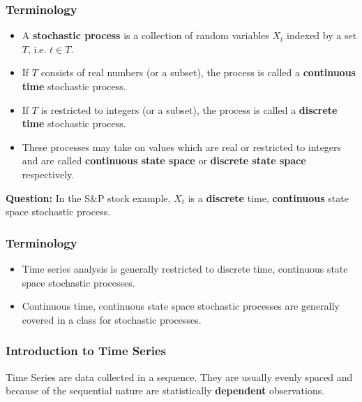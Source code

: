 \documentclass[%
xcolor=pdftex]{beamer}
\begin{document}
\begin{frame}
\frametitle{Terminology}

\begin{itemize}

\item A \textbf{stochastic process} is a collection of random variables $X_t$ indexed by a set $T$, i.e. $t \in T$.


\item If $T$ consists of real numbers (or a subset), the process is called a \textbf{continuous time} stochastic process.

\item If $T$ is restricted to integers (or a subset), the process is called a \textbf{discrete time} stochastic process.

\item These processes may take on values which are real or restricted to integers and are called \textbf{continuous state space} or \textbf{discrete state space} respectively. 

\end{itemize}

\textbf{Question:} In the S\&P stock example, $X_t$ is a \textbf{discrete} time, \textbf{continuous} state space stochastic process.

\end{frame}

\begin{frame}
\frametitle{Terminology}

\begin{itemize}

\item Time series analysis is generally restricted to discrete time, continuous state space stochastic processes.

\item Continuous time, continuous state space stochastic processes are generally covered in a class for stochastic processes.

\end{itemize}

\end{frame}

\begin{frame}
\frametitle{Introduction to Time Series}

Time Series are data collected in a sequence.  They are usually evenly spaced and because of the sequential nature are statistically \textbf{dependent} observations.

\end{frame}
\end{document}

